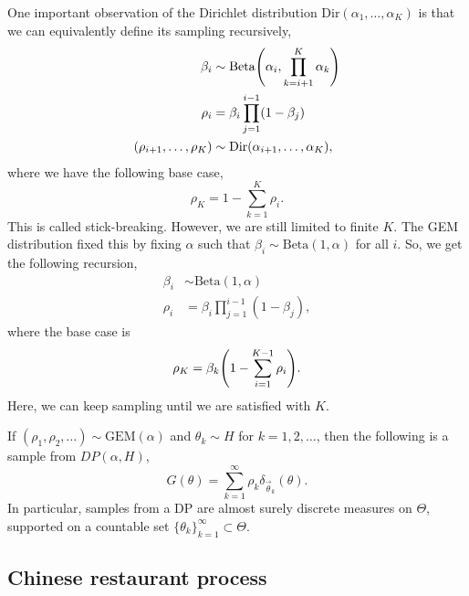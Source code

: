 One important observation of the Dirichlet distribution $\mathrm{Dir}(\alpha_1, \ldots, \alpha_K)$
is that we can equivalently define its sampling recursively,
\begin{align*}
    \beta_i                      & \sim \mathrm{Beta} \lft( \alpha_i, \prod_{k=i+1}^K \alpha_k \rgt) \\
    \rho_i                       & = \beta_i \prod_{j=1}^{i-1} (1-\beta_j)                           \\
    (\rho_{i+1}, \ldots, \rho_K) & \sim \mathrm{Dir}(\alpha_{i+1}, \ldots, \alpha_K),
\end{align*}
where we have the following base case, \[
    \rho_K = 1 - \sum_{k=1}^{K} \rho_i.
\]
This is called stick-breaking. However, we are still limited to finite $K$. The GEM distribution
fixed this by fixing $\alpha$ such that $\beta_i \sim \mathrm{Beta}(1, \alpha)$ for all $i$. So, we
get the following recursion,
\begin{align*}
    \beta_i & \sim \mathrm{Beta}(1, \alpha)              \\
    \rho_i  & = \beta_i \prod_{j=1}^{i-1} (1 - \beta_j),
\end{align*}
where the base case is \[
    \rho_K = \beta_k \lft( 1 - \sum_{i=1}^{K-1} \rho_i \rgt).
\]
Here, we can keep sampling until we are satisfied with $K$.

If $(\rho_1, \rho_2, \ldots) \sim \mathrm{GEM}(\alpha)$ and $\theta_k \sim H$ for $k=1,2,\ldots$,
then the following is a sample from $DP(\alpha, H)$, \[
    G(\theta) = \sum_{k=1}^{\infty} \rho_k \delta_{\vec{\theta}_k}(\theta).
\]
In particular, samples from a DP are almost surely discrete measures on $\Theta$, supported on a
countable set $\{ \theta_k \}_{k=1}^{\infty} \subset \Theta$.

\subsection{Chinese restaurant process}

